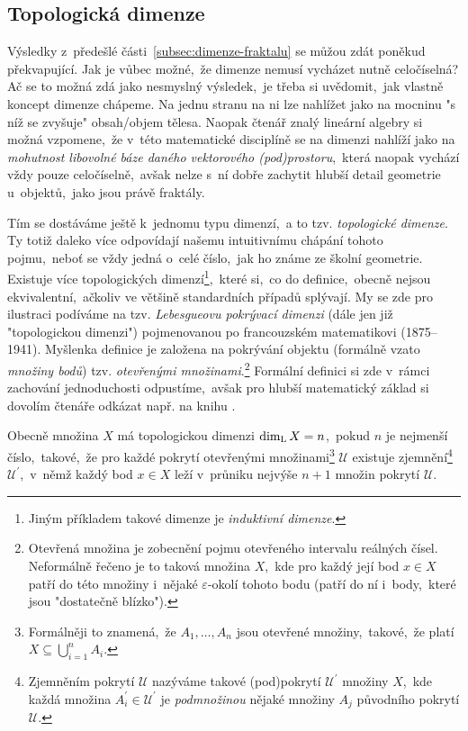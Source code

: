 \subsection{Topologická dimenze}\label{subsec:topologicka-dimenze}

Výsledky z~předešlé části~\ref{subsec:dimenze-fraktalu} se můžou zdát poněkud překvapující. Jak je vůbec možné,~že dimenze nemusí vycházet nutně celočíselná? Ač se to možná zdá jako nesmyslný výsledek,~je třeba si uvědomit,~jak vlastně koncept dimenze chápeme. Na jednu stranu na ni lze nahlížet jako na mocninu "s níž se zvyšuje" obsah/objem tělesa. Naopak čtenář znalý lineární algebry si možná vzpomene,~že v~této matematické disciplíně se na dimenzi nahlíží jako na \emph{mohutnost libovolné báze daného vektorového (pod)prostoru},~která naopak vychází vždy pouze celočíselně,~avšak nelze s~ní dobře zachytit hlubší detail geometrie u~objektů,~jako jsou právě fraktály.

Tím se dostáváme ještě k~jednomu typu dimenzí,~a to tzv. \emph{topologické dimenze}. Ty totiž daleko více odpovídají našemu intuitivnímu chápání tohoto pojmu,~neboť se vždy jedná o~celé číslo,~jak ho známe ze školní geometrie. Existuje více topologických dimenzí\footnote{Jiným příkladem takové dimenze je \emph{induktivní dimenze}.},~které si,~co do definice,~obecně nejsou ekvivalentní,~ačkoliv ve většině standardních případů splývají. My se zde pro ilustraci podíváme na tzv. \emph{Lebesgueovu pokrývací dimenzi} (dále jen již "topologickou dimenzi") pojmenovanou po francouzském matematikovi  (1875--1941). Myšlenka definice je založena na pokrývání objektu (formálně vzato \emph{množiny bodů}) tzv. \emph{otevřenými množinami}.\footnote{Otevřená množina je zobecnění pojmu otevřeného intervalu reálných čísel. Neformálně řečeno je to taková množina $X$,~kde pro každý její bod $x\in X$ patří do této množiny i~nějaké $\varepsilon$-okolí tohoto bodu (patří do ní i~body,~které jsou "dostatečně blízko").} Formální definici si zde v~rámci zachování jednoduchosti odpustíme,~avšak pro hlubší matematický základ si dovolím čtenáře odkázat např. na knihu \cite{Engelking1989}.

Obecně množina $X$ má topologickou dimenzi $\operatorname{dim_L}{X}=n$,~pokud $n$ je nejmenší číslo,~takové,~že pro každé pokrytí otevřenými množinami\footnote{Formálněji to znamená,~že $A_1,\dots,A_n$ jsou otevřené množiny,~takové,~že platí $X\subseteq\bigcup_{i=1}^n{A_i}$.} $\mathcal{U}$ existuje zjemnění\footnote{Zjemněním pokrytí $\mathcal{U}$ nazýváme takové (pod)pokrytí $\mathcal{U}^\prime$ množiny $X$,~kde každá množina $A_i^\prime\in\mathcal{U}^\prime$ je \emph{podmnožinou} nějaké množiny $A_j$ původního pokrytí $\mathcal{U}$.} $\mathcal{U}^\prime$,~v~němž každý bod $x\in X$ leží v~průniku nejvýše $n+1$ množin pokrytí $\mathcal{U}$.

